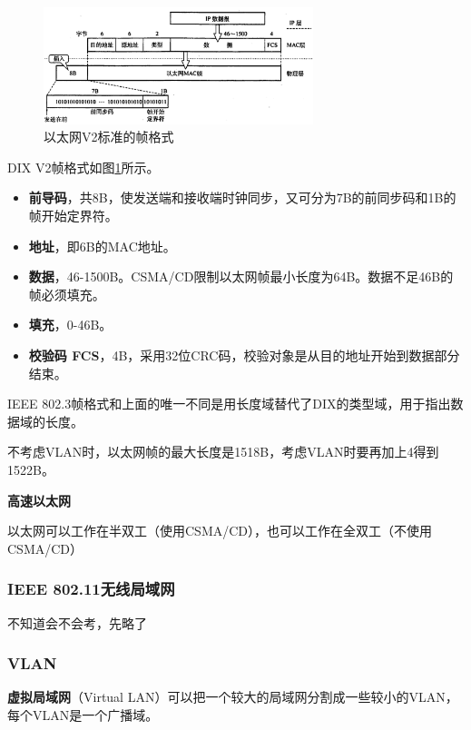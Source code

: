 \documentclass[12pt, a4paper, oneside]{ctexart}
\begin{document}
\begin{enumerate}
    \begin{figure}[h]
        \centering
        \includegraphics[width=0.7\textwidth]{./images/ethernet-v2-frame.png}
        \caption{以太网V2标准的帧格式}
        \label{ethernet-v2-frame}
    \end{figure}

    DIX V2帧格式如图\ref{ethernet-v2-frame}所示。
    \begin{itemize}
        \item {\bf 前导码}，共8B，使发送端和接收端时钟同步，又可分为7B的前同步码和1B的帧开始定界符。
        \item {\bf 地址}，即6B的MAC地址。
        \item {\bf 数据}，46-1500B。CSMA/CD限制以太网帧最小长度为64B。数据不足46B的帧必须填充。
        \item {\bf 填充}，0-46B。
        \item {\bf 校验码 FCS}，4B，采用32位CRC码，校验对象是从目的地址开始到数据部分结束。
    \end{itemize}

    IEEE 802.3帧格式和上面的唯一不同是用长度域替代了DIX的类型域，用于指出数据域的长度。

    不考虑VLAN时，以太网帧的最大长度是1518B，考虑VLAN时要再加上4得到1522B。

    {\bf 高速以太网}

    以太网可以工作在半双工（使用CSMA/CD），也可以工作在全双工（不使用CSMA/CD）
\end{enumerate}

\subsubsection{IEEE 802.11无线局域网}

不知道会不会考，先略了

\subsubsection{VLAN}

\textbf{虚拟局域网}（Virtual LAN）可以把一个较大的局域网分割成一些较小的VLAN，每个VLAN是一个广播域。
\end{document}
